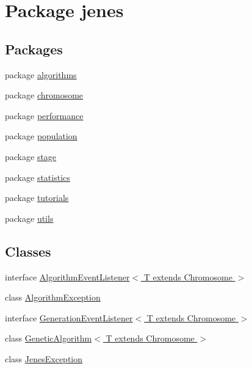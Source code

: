 \hypertarget{namespacejenes}{\section{Package jenes}
\label{namespacejenes}
}
\subsection*{Packages}
\begin{DoxyCompactItemize}
\item 
package \hyperlink{namespacejenes_1_1algorithms}{algorithms}
\item 
package \hyperlink{namespacejenes_1_1chromosome}{chromosome}
\item 
package \hyperlink{namespacejenes_1_1performance}{performance}
\item 
package \hyperlink{namespacejenes_1_1population}{population}
\item 
package \hyperlink{namespacejenes_1_1stage}{stage}
\item 
package \hyperlink{namespacejenes_1_1statistics}{statistics}
\item 
package \hyperlink{namespacejenes_1_1tutorials}{tutorials}
\item 
package \hyperlink{namespacejenes_1_1utils}{utils}
\end{DoxyCompactItemize}
\subsection*{Classes}
\begin{DoxyCompactItemize}
\item 
interface \hyperlink{interfacejenes_1_1_algorithm_event_listener_3_01_t_01extends_01_chromosome_01_4}{Algorithm\-Event\-Listener$<$ T extends Chromosome $>$}
\item 
class \hyperlink{classjenes_1_1_algorithm_exception}{Algorithm\-Exception}
\item 
interface \hyperlink{interfacejenes_1_1_generation_event_listener_3_01_t_01extends_01_chromosome_01_4}{Generation\-Event\-Listener$<$ T extends Chromosome $>$}
\item 
class \hyperlink{classjenes_1_1_genetic_algorithm_3_01_t_01extends_01_chromosome_01_4}{Genetic\-Algorithm$<$ T extends Chromosome $>$}
\item 
class \hyperlink{classjenes_1_1_jenes_exception}{Jenes\-Exception}
\end{DoxyCompactItemize}
